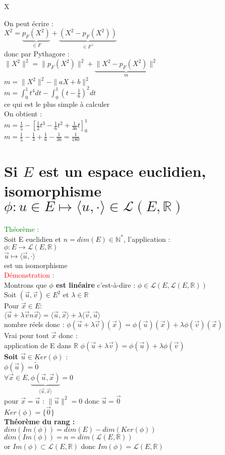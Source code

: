 X\documentclass{article}
\begin{document}
On peut écrire : \\
$X^2=\underbrace{p_F(X^2)}_{ \in F}+ \underbrace{(X^2-p_F(X^2))}_{\in F^\perp}$ \\
donc par Pythagore : \\
$\| X^2 \|^2= \| p_F(X^2) \|^2+ \underbrace{\|X^2-p_F(X^2)\|^2}_{m}$ \\
$m= \| X^2 \|^2 - \| aX+b \|^2$ \\
$m= \int_0^1 t^4 dt - \int_0^1 (t-\frac{1}{6})^2dt$ \\
ce qui est le plus simple à calculer \\
On obtient : \\
$m= \frac 1 5 - [ \frac 1 2 t^3 - \frac 1 6 t^2 + \frac 1 {36} t]_0^1$ \\
$m= \frac 15 - \frac 1 3 + \frac 1 6 - \frac 1 {36}= \frac 1 {180}$
\section{Si $E$ est un espace euclidien, isomorphisme \\ $\phi : u \in E \mapsto \langle u, \cdot \rangle \in \mathcal L(E, \mathbb R)$}
\textcolor{green}{Théorème :} \\
Soit E euclidien et $n=dim(E) \in \mathbb N^*$, l'application : \\
$\phi : E \rightarrow \mathcal L (E, \mathbb R)$ \\
$\vec u \mapsto \langle \vec u, \cdot \rangle $ \\
est un isomorphisme \\
\textcolor{red}{Démonstration :} \\
Montrons que {\bf \boldmath $\phi$ est linéaire} c'est-à-dire : $\phi \in \mathcal L(E,\mathcal L(E,\mathbb R))$ \\
Soit $(\vec u, \vec v) \in E^2$ et $\lambda \in \mathbb R$ \\
Pour $\vec x \in E :$ \\
$\langle \vec u + \lambda \vec vn \vec x \rangle = \langle \vec u ,\vec x \rangle + \lambda \langle \vec v, \vec u \rangle$ \\
nombre réels  donc : $\phi(\vec u+ \lambda \vec v)(\vec x)=\phi(\vec u)(\vec x) + \lambda \phi(\vec v)(\vec x)$ \\
Vrai pour tout $\vec x$ donc : \\
application de E dans $\mathbb R$ $\phi(\vec u + \lambda \vec v)=\phi(\vec u)+ \lambda \phi(\vec v)$ \\
{\bf \boldmath Soit $\vec u \in Ker(\phi)$} : \\
$\phi(\vec u)= \tilde{0}$ \\
$\forall \vec x \in E, \underbrace{\phi(\vec u, \vec x)}_{\langle \vec u,\vec x \rangle}=0$ \\
pour $\vec x = \vec u$ : $\| \vec u \|^2=0$ donc $\vec u= \vec 0$ \\
$Ker(\phi)= \lbrace \vec 0 \rbrace$ \\
{\bf Théorème du rang :} \\
$dim(Im(\phi))= dim(E)-dim(Ker(\phi))$ \\
$dim(Im(\phi))=n=dim(\mathcal L(E,\mathbb R))$ \\
or $Im(\phi) \subset \mathcal L(E,\mathbb R)$ donc $Im(\phi) = \mathcal L(E, \mathbb R)$
\end{document}
